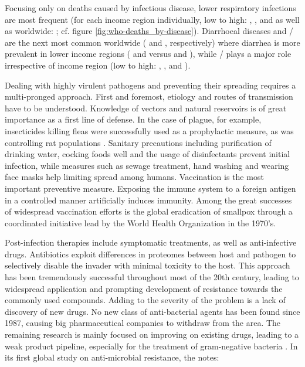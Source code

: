 

Focusing only on deaths caused by infectious disease, lower respiratory infections are most frequent (for each income region individually, low to high: \knitrPercentageInfectTwelveLowLRI{}, \knitrPercentageInfectTwelveLmidLRI{}, \knitrPercentageInfectTwelveUmidLRI{} and \knitrPercentageInfectTwelveHighLRI{} as well as worldwide: \knitrPercentageInfectTwelveWorldLRI{}; cf. figure \ref{fig:who-deaths_by-disease}). Diarrhoeal diseases and \slash {} are the next most common worldwide (\knitrPercentageInfectTwelveWorldDiarr{} and \knitrPercentageInfectTwelveWorldAIDS{}, respectively) where diarrhea is more prevalent in lower income regions (\knitrPercentageInfectTwelveLowDiarr{} and \knitrPercentageInfectTwelveLmidDiarr{} versus \knitrPercentageInfectTwelveUmidDiarr{} and \knitrPercentageInfectTwelveHighDiarr{}), while \slash {} plays a major role irrespective of income region (low to high: \knitrPercentageInfectTwelveLowAIDS{}, \knitrPercentageInfectTwelveLmidAIDS{}, \knitrPercentageInfectTwelveUmidAIDS{} and \knitrPercentageInfectTwelveHighAIDS{}).

Dealing with highly virulent pathogens and preventing their spreading requires a multi-pronged approach. First and foremost, etiology and routes of transmission have to be understood. Knowledge of vectors and natural reservoirs is of great importance as a first line of defense. In the case of plague, for example, insecticides killing fleas were successfully used as a prophylactic measure, as was controlling rat populations \citep{Barnes1990}. Sanitary precautions including purification of drinking water, cocking foods well and the usage of disinfectants prevent initial infection, while measures such as sewage treatment, hand washing and wearing face masks help limiting spread among humans. Vaccination is the most important preventive measure. Exposing the immune system to a foreign antigen in a controlled manner artificially induces immunity. Among the great successes of widespread vaccination efforts is the global eradication of smallpox through a coordinated initiative lead by the World Health Organization in the 1970's.

Post-infection therapies include symptomatic treatments, as well as anti-in\-fec\-tive drugs. Antibiotics exploit differences in proteomes between host and pathogen to selectively disable the invader with minimal toxicity to the host. This approach has been tremendously successful throughout most of the 20th century, leading to widespread application and prompting development of resistance towards the commonly used compounds. Adding to the severity of the problem is a lack of discovery of new drugs. No new class of anti-bacterial agents has been found since 1987, causing big pharmaceutical companies to withdraw from the area. The remaining research is mainly focused on improving on existing drugs, leading to a weak product pipeline, especially for the treatment of gram-negative bacteria \citep{Silver2011}. In its first global study on anti-microbial resistance, the \citet{WHO2014} notes:

